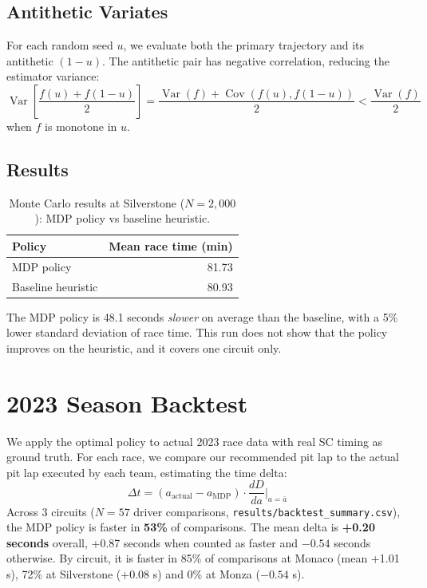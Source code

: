 \documentclass[11pt, a4paper, twocolumn]{article}
\numberwithin{equation}{section}
\theoremstyle{definition}
\newcommand{\age}{a}
\begin{document}
\subsection{Antithetic Variates}

For each random seed $u$, we evaluate both the primary trajectory and its
antithetic $(1-u)$. The antithetic pair has negative correlation, reducing
the estimator variance:
\begin{equation}
  \operatorname{Var}\!\left[\frac{f(u) + f(1-u)}{2}\right]
  = \frac{\operatorname{Var}(f) + \operatorname{Cov}(f(u), f(1-u))}{2}
  < \frac{\operatorname{Var}(f)}{2}
\end{equation}
when $f$ is monotone in $u$.

\subsection{Results}

\begin{table}[!h]
  \centering
  \small
  \caption{Monte Carlo results at Silverstone ($N = 2{,}000$): MDP policy vs baseline heuristic.}
  \label{tab:mc}
  \begin{tabular}{@{}lr@{}}
    \toprule
    Policy & Mean race time (min) \\
    \midrule
    MDP policy & 81.73 \\
    Baseline heuristic & 80.93 \\
    \bottomrule
  \end{tabular}
\end{table}

The MDP policy is 48.1 seconds \emph{slower} on average than the baseline, with a
5\% lower standard deviation of race time. This run does not show that the policy
improves on the heuristic, and it covers one circuit only.

\section{2023 Season Backtest}

We apply the optimal policy to actual 2023 race data with real SC timing
as ground truth. For each race, we compare our recommended pit lap to the
actual pit lap executed by each team, estimating the time delta:
\begin{equation}
  \Delta t = (\age_{\text{actual}} - \age_{\text{MDP}}) \cdot
  \frac{dD}{d\age}\bigg|_{\age = \bar{\age}}
\end{equation}
Across 3 circuits ($N = 57$ driver comparisons, \texttt{results/backtest\_summary.csv}),
the MDP policy is faster in \textbf{53\%} of comparisons. The mean delta is
\textbf{+0.20 seconds} overall, +0.87 seconds when counted as faster and $-0.54$
seconds otherwise. By circuit, it is faster in 85\% of comparisons at Monaco
(mean +1.01 s), 72\% at Silverstone (+0.08 s) and 0\% at Monza ($-0.54$ s).
\end{document}
